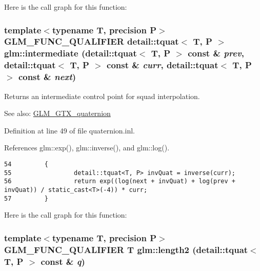 Here is the call graph for this function:\hypertarget{group__gtx__quaternion_ge94a070898e8be560a5dcf8e15854b2d}{
\subsubsection[intermediate]{\setlength{\rightskip}{0pt plus 5cm}template$<$typename T, precision P$>$ GLM\_\-FUNC\_\-QUALIFIER detail::tquat$<$ T, P $>$ glm::intermediate (detail::tquat$<$ T, P $>$ const \& {\em prev}, \/  detail::tquat$<$ T, P $>$ const \& {\em curr}, \/  detail::tquat$<$ T, P $>$ const \& {\em next})}}
\label{group__gtx__quaternion_ge94a070898e8be560a5dcf8e15854b2d}


Returns an intermediate control point for squad interpolation.

\begin{Desc}
\item[See also:]\hyperlink{group__gtx__quaternion}{GLM\_\-GTX\_\-quaternion} \end{Desc}


Definition at line 49 of file quaternion.inl.

References glm::exp(), glm::inverse(), and glm::log().

\begin{Code}\begin{verbatim}54         {
55                 detail::tquat<T, P> invQuat = inverse(curr);
56                 return exp((log(next + invQuat) + log(prev + invQuat)) / static_cast<T>(-4)) * curr;
57         }
\end{verbatim}
\end{Code}




Here is the call graph for this function:\hypertarget{group__gtx__quaternion_ge0ff959e757f5feba0bd375658673d0d}{
\subsubsection[length2]{\setlength{\rightskip}{0pt plus 5cm}template$<$typename T, precision P$>$ GLM\_\-FUNC\_\-QUALIFIER T glm::length2 (detail::tquat$<$ T, P $>$ const \& {\em q})}}
\label{group__gtx__quaternion_ge0ff959e757f5feba0bd375658673d0d}



